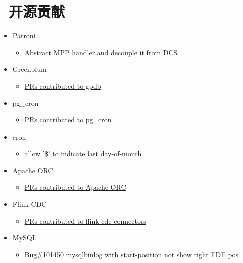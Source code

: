 \documentclass{resume}
\begin{document}
\section{\faCodeFork\ 开源贡献}
\begin{onehalfspacing}
  \begin{itemize}
    \item Patroni
      \begin{itemize}
        \item \href{https://github.com/zalando/patroni/pull/2960}{Abstract MPP handler and decouple it from DCS}
      \end{itemize}
    \item Greenplum
      \begin{itemize}
        \item \href{https://github.com/greenplum-db/gpdb/pulls?q=is%3Apr+author%3A%40me+}{PRs contributed to gpdb}
      \end{itemize}
    \item pg\_cron
      \begin{itemize}
        \item \href{https://github.com/citusdata/pg_cron/pulls?q=is%3Apr+author%3A%40me+}{PRs contributed to pg\_cron}
      \end{itemize}
    \item cron
      \begin{itemize}
        \item \href{https://github.com/vixie/cron/pull/20}{allow '\$' to indicate last day-of-month}
      \end{itemize}
    \item Apache ORC
      \begin{itemize}
        \item \href{https://github.com/apache/orc/pulls?q=is%3Apr+author%3A%40me+}{PRs contributed to Apache ORC}
      \end{itemize}
    \item Flink CDC
      \begin{itemize}
        \item \href{https://github.com/ververica/flink-cdc-connectors/pulls?q=is%3Apr+author%3Azhjwpku+}{PRs contributed to flink-cdc-connectors}
      \end{itemize}
    \item MySQL
      \begin{itemize}
        \item \href{https://github.com/mysql/mysql-server/pull/313}{Bug\#101450 mysqlbinlog with start-position not show right FDE pos}

\end{itemize}
\end{itemize}
\end{onehalfspacing}
\end{document}
